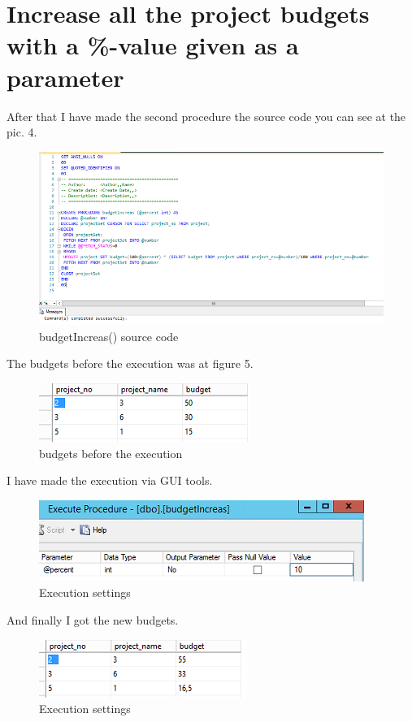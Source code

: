 \documentclass[english]{article}
\begin{document}
\section{Increase all the project budgets with a \%-value given as a parameter}
After that I have made the second procedure the source code you can see at the pic. 4.
\begin{figure}[H]
\centerline{\includegraphics[scale=0.8]{ProcedureSQL/secondeProcedureSource}}
\caption{budgetIncreas() source code}
\end{figure}
The budgets before the execution was at figure 5.
\begin{figure}[H]
\centerline{\includegraphics[scale=0.8]{ProcedureSQL/budgetBeffor}}
\caption{budgets before the execution}
\end{figure}
I have made the execution via GUI tools.  
\begin{figure}[H]
\centerline{\includegraphics[scale=0.8]{ProcedureSQL/executionbudget}}
\caption{Execution settings}
\end{figure}
And finally I got the new budgets.
\begin{figure}[H]
\centerline{\includegraphics[scale=0.8]{ProcedureSQL/budgetAfter}}
\caption{Execution settings}
\end{figure}
\end{document}
